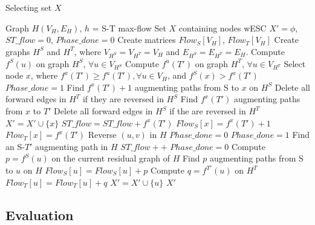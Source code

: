 \documentclass[conference]{IEEEtran}
\begin{document}
\begin{algorithm}[!t]
\small
\caption{Selecting set $X$}
\label{ALG:SelectingX}
\begin{algorithmic}[1]
\REQUIRE Graph $H(V_H,E_H)$, $h$ = S-T max-flow
\ENSURE Set $X$ containing nodes wESC 
\STATE $X' = \phi$, $ST\_flow = 0$,  $Phase\_done = 0$
\STATE Create matrices $Flow_S[V_H]$, $Flow_T[V_H]$ 
\STATE {}
\STATE Create graphs $H^S$ and $H^T$, where $V_{H^S} = V_{H^T} = V_{H}$ and $E_{H^S} = E_{H^T} = E_{H}$. 
\STATE Compute $f^S(u)$ on graph $H^S$, $\forall u \in V_{H^S}$
\STATE Compute $f^u(T')$ on graph $H^T$, $\forall u \in V_{H^T}$
\STATE Select node $x$, where $f^x(T') \geq f^u(T'), \forall u \in V_H$, and $f^S(x) > f^x(T')$
\STATE $Phase\_done = 1$
\ELSE
\STATE Find $f^x(T')+1$ augmenting paths from S to $x$ on $H^S$
\STATE Delete all forward edges in $H^T$ if they are reversed in $H^S$
\STATE Find $f^x(T')$ augmenting paths from $x$ to $T'$
\STATE Delete all forward edges in $H^S$ if the are reversed in $H^T$ 
\STATE $X' = X' \cup \{x\}$
\STATE $ST\_flow = ST\_flow + f^x(T')$
\STATE $Flow_S[x] = f^x(T') + 1$
\STATE $Flow_T[x] = f^x(T')$
\ENDIF
\ENDWHILE
{}
\STATE Reverse $(u,v)$ in $H$
\ENDIF
\ENDFOR
\STATE $Phase\_done = 0$ 
\STATE $Phase\_done = 1$
\ELSE
\STATE Find an S-$T'$ augmenting path in $H$
\STATE $ST\_flow++$ 
\ENDIF
\ENDWHILE
\STATE $Phase\_done = 0$ 
\STATE Compute $p = f^S(u)$ on the current residual graph of $H$
\STATE Find $p$ augmenting paths from S to $u$ on $H$
\STATE $Flow_S[u] = Flow_S[u] + p$
\ENDIF
{}
\STATE Compute $q = f^{T'}(u)$ on $H^T$
\STATE $Flow_T[u] = Flow_T[u] + q$
\STATE $X' = X' \cup \{u\}$
\ENDIF
\ENDFOR
\RETURN $X'$
\end{algorithmic}
\end{algorithm}

\subsection{Evaluation}
\end{document}
